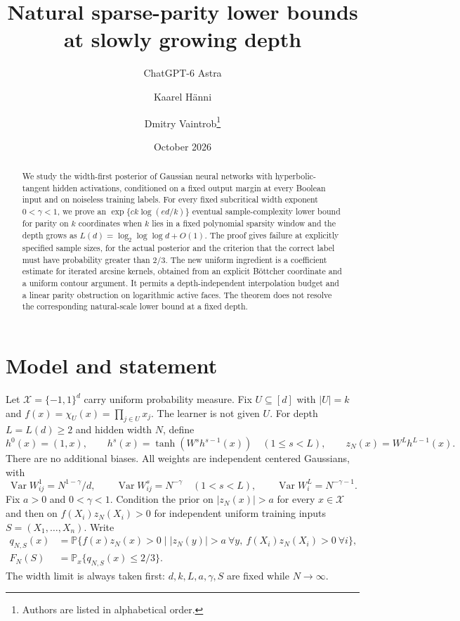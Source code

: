 \documentclass[11pt]{article}
\title{Natural sparse-parity lower bounds at slowly growing depth}
\author{ChatGPT-6 Astra \and Kaarel H\"anni \and Dmitry Vaintrob\thanks{Authors are listed in alphabetical order.}}
\date{October 2026}
\theoremstyle{remark}\newtheorem{remark}[theorem]{Remark}
\DeclareMathOperator{\Var}{Var}
\newcommand{\Pp}{\mathbb P}
\begin{document}
\maketitle
\begin{abstract}
We study the width-first posterior of Gaussian neural networks with
hyperbolic-tangent hidden activations, conditioned on a fixed output
margin at every Boolean input and on noiseless training labels.
For every fixed subcritical width exponent $0<\gamma<1$, we prove an
$\exp\{c k\log(ed/k)\}$ eventual sample-complexity lower bound for
parity on $k$ coordinates when $k$ lies in a fixed polynomial sparsity
window and the depth grows as $L(d)=\log_2\log\log d+O(1)$.
The proof gives failure at explicitly specified sample sizes, for the
actual posterior and the criterion that the correct label must have
probability greater than $2/3$.
The new uniform ingredient is a coefficient estimate for iterated
arcsine kernels, obtained from an explicit B\"ottcher coordinate and a
uniform contour argument. It permits a depth-independent interpolation
budget and a linear parity obstruction on logarithmic active faces.
The theorem does not resolve the corresponding natural-scale lower
bound at a fixed depth.
\end{abstract}

\section{Model and statement}
Let $\mathcal X=\{-1,1\}^d$ carry uniform probability measure.
Fix $U\subseteq[d]$ with $|U|=k$ and
$f(x)=\chi_U(x)=\prod_{j\in U}x_j$.
The learner is not given $U$. For depth $L=L(d)\ge2$ and hidden width
$N$, define
\[
 h^0(x)=(1,x),\qquad
 h^s(x)=\tanh(W^s h^{s-1}(x))\quad(1\le s<L),\qquad
 z_N(x)=W^L h^{L-1}(x).
\]
There are no additional biases. All weights are independent centered
Gaussians, with
\begin{equation}\label{eq:weights}
 \Var W^1_{ij}=N^{1-\gamma}/d,\qquad
 \Var W^s_{ij}=N^{-\gamma}\quad(1<s<L),\qquad
 \Var W^L_i=N^{-\gamma-1}.
\end{equation}
Fix $a>0$ and $0<\gamma<1$. Condition the prior on
$|z_N(x)|>a$ for every $x\in\mathcal X$ and then on
$f(X_i)z_N(X_i)>0$ for independent uniform training inputs
$S=(X_1,\ldots,X_n)$. Write
\begin{align*}
 q_{N,S}(x)&=\Pp\{f(x)z_N(x)>0\mid
        |z_N(y)|>a\ \forall y,\ f(X_i)z_N(X_i)>0\ \forall i\},\\
 F_N(S)&=\Pp_x\{q_{N,S}(x)\le2/3\}.
\end{align*}
The width limit is always taken first: $d,k,L,a,\gamma,S$ are fixed
while $N\to\infty$.
\end{document}
